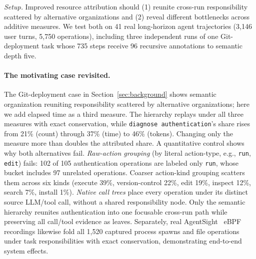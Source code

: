 \documentclass[sigconf,nonacm]{acmart}
\begin{document}
\emph{Setup.} Improved resource attribution should (1) reunite cross-run responsibility scattered by alternative organizations and (2) reveal different bottlenecks across additive measures.
We test both on 41 real long-horizon agent trajectories (3{,}146 user turns, 5{,}750 operations), including three independent runs of one Git-deployment task whose 735 steps receive 96 recursive annotations to semantic depth five.

\paragraph{The motivating case revisited.}
The Git-deployment case in Section~\ref{sec:background} shows semantic organization reuniting responsibility scattered by alternative organizations; here we add elapsed time as a third measure.
The hierarchy replays under all three measures with exact conservation, while \texttt{diagnose authentication}'s share rises from 21\% (count) through 37\% (time) to 46\% (tokens). Changing only the measure more than doubles the attributed share.
A quantitative control shows why both alternatives fail.
\emph{Raw-action grouping} (by literal action-type, e.g., \texttt{run}, \texttt{edit}) fails: 102 of 105 authentication operations are labeled only \texttt{run}, whose bucket includes 97 unrelated operations. Coarser action-kind grouping scatters them across six kinds (execute 39\%, version-control 22\%, edit 19\%, inspect 12\%, search 7\%, install 1\%).
\emph{Native call trees} place every operation under its distinct source LLM/tool call, without a shared responsibility node.
Only the semantic hierarchy reunites authentication into one focusable cross-run path while preserving all call/tool evidence as leaves.
Separately, real AgentSight~\cite{agentsight} eBPF recordings likewise fold
all 1{,}520 captured process spawns and file operations under task
responsibilities with exact conservation, demonstrating end-to-end system effects.
\end{document}
